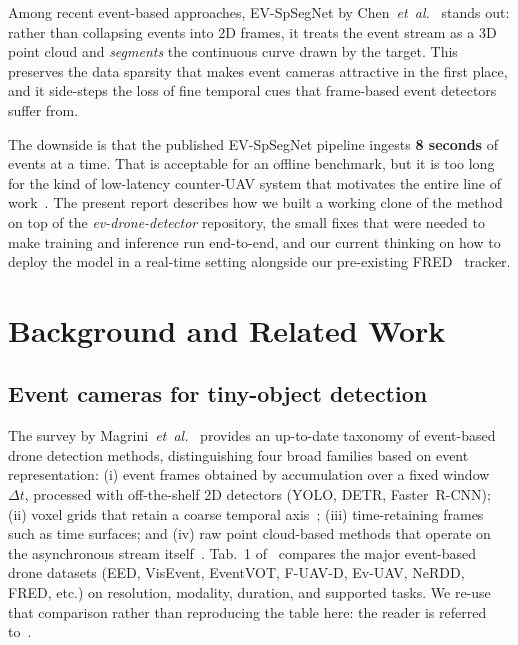 \documentclass[11pt,a4paper]{article}
\begin{document}
Among recent event-based approaches, EV-SpSegNet by
Chen~\textit{et~al.}~\cite{chen2025evspsegnet} stands out: rather than
collapsing events into 2D frames, it treats the event stream as a 3D
point cloud and \emph{segments} the continuous curve drawn by the
target. This preserves the data sparsity that makes event cameras
attractive in the first place, and it side-steps the loss of fine
temporal cues that frame-based event detectors suffer from.

The downside is that the published EV-SpSegNet pipeline ingests
\textbf{8 seconds} of events at a time. That is acceptable for an
offline benchmark, but it is too long for the kind of low-latency
counter-UAV system that motivates the entire line of
work~\cite{magrini2025survey}. The present report describes how we
built a working clone of the method on top of the \emph{ev-drone-detector}
repository, the small fixes that were needed to make training and
inference run end-to-end, and our current thinking on how to deploy
the model in a real-time setting alongside our pre-existing
FRED~\cite{magrini2025fred} tracker.

\section{Background and Related Work}

\subsection{Event cameras for tiny-object detection}

The survey by Magrini~\textit{et~al.}~\cite{magrini2025survey}
provides an up-to-date taxonomy of event-based drone detection
methods, distinguishing four broad families based on event
representation: (i) event frames obtained by accumulation over a
fixed window~$\Delta t$, processed with off-the-shelf 2D detectors
(YOLO, DETR, Faster~R-CNN); (ii) voxel grids that retain a coarse
temporal axis~\cite{gehrig2023rvt}; (iii) time-retaining frames such
as time surfaces; and (iv) raw point cloud-based methods that
operate on the asynchronous stream
itself~\cite{chen2025evspsegnet,thomas2019kpconv,hu2020randla}.
Tab.~1 of~\cite{magrini2025survey} compares the major event-based
drone datasets (EED, VisEvent, EventVOT, F-UAV-D, Ev-UAV, NeRDD,
FRED, etc.) on resolution, modality, duration, and supported tasks.
We re-use that comparison rather than reproducing the table here:
the reader is referred to~\cite[Tab.~1]{magrini2025survey}.
\end{document}
